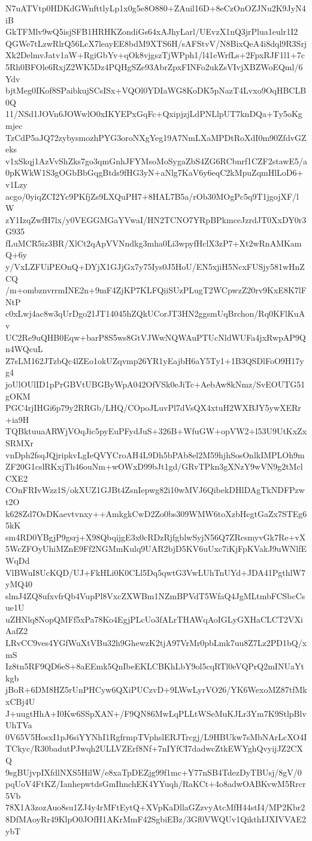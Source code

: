 N7uATVtp0HDKdGWnfttlyLp1x0g5e8O880+ZAuil16D+8eCzOnOZJNu2K9JyN4iB
GkTFMlv9wQ5isjSFB1HRHKZondiGs64xAJhyLarl/UEvzX1nQ3jrPlua1eulr1I2
QGWe7tLzwRlrQ56LcX7leayEE8bdM9XTS6H/sAFStvV/N8BixQeA4i8dql9R3Srj
Xk2DelmvJatv1aW+RgiGbYv+qOk8vjgszTjWPph1/l41eWrfLs+2FpxRJF1l1+7c
5Rh0BFOle6RxjZ2WK5Dz4PQHgSZe93AbrZpxFINFo2ukZsVIvjXBZWoEQml/6Ydv
bjtMeg0IKof8SPaibkujSCsISx+VQOl0YDIaWG8KoDK5pNazT4Lvxo9OqHBCLB0Q
11/NSd1JOVn6JOWwlO0xIKYEPxGqFc+QxipjzjLdPNLlpUT7knDQa+Ty5oKgmjec
TzCdP5aJQ72zybysmozhPYG3oroNXgYeg19A7NmLXaMPDtRoXdI0m90ZfdvGZeks
v1xSkqj1AzVvShZks7go3qmGnhJFYMsoMoSygaZbS4ZG6RCbnrf1CZF2stawE5/a
0pKWkW1S3gOGbBbGqgBtds9fHG3yN+aNlg7KaV6y6eqC2kMpuZqmHlLoD6+v1Lzy
acgo/0yiqZCI2Yc9PKfjZs9LXQuPH7+8HAL7B5a/rOb30MOgPc5q9T1jgojXF/lW
zY1IzqZwfH7lx/y0VEGGMGaYVwaI/HN2TCNO7YRpBPkmceJzrdJT0XxDY0r3G935
fLuMCR5iz3BR/XlCt2qApVVNndkg3mha0Li3wpyfHclX3zP7+Xt2wRnAMKamQ+6y
y/VxLZFUiPEOnQ+DYjX1GJjGx7y75Iys0J5HoU/EN5xjiH5NcxFUSjy581wHnZCQ
/m+ombznvrrmINE2n+9mF4ZjKP7KLFQiiSUzPLugT2WCpwzZ20rv9KxE8K7lFNtP
c0xLwj4ac8w3qUrDgo21JT14045hZQkUCorJT3HN2ggsmUqBrchon/Rq0KFlKuAv
UC2Re9uQHB0Eqw+barP8S5ws8GtVJWwNQWAuPTUcNldWUFa4jxRwpAP9Qn4WQcuL
Z7sLM162JTzbQc4lZEo1okUZqvmp26YR1yEajbH6aY5Ty1+1B3QSDlFoO9H17yg4
joUlOUlID1pPrGBVtUBGByWpA042OfVSk0eJiTc+AebAw8kNmz/SvEOUTG51gOKM
PGC4rjIHGi6p79y2RRGb/LHQ/COpoJLuvPl7dVsQX4xtuH2WXBJY5ywXERr+ia9H
TQBktuuaARWjVOqJic5pyEuPFydJuS+326B+WfuGW+opVW2+l53U9UtKxZxSRMXr
vnDph2fsqJQjripkvLgIeQVYCroAH4L9Dh5bPAb8el2M59hjhSosOnlkIMPLOh9m
ZF20G1cslRKxjTh46ouNm+wOWxD99bJt1gd/GRvTPkn3gXNzY9wVN9g2tMclCXE2
COnFRIvWzz1S/okXUZ1GJBt4ZsnIepwg82i10wMVJ6QibekDHlDAgTkNDFPzwt2O
k628Zd7OsDKaevtvnxy++AmkgkCwD2Zo0bs309WMW6toXzbHcgtGaZx7STEg65kK
sm4RD0YBgjP9gsrj+X98QbqijgE3x0cRDzRjfgblwSyjN56Q7ZRcsmyvGk7Re+vX
5WcZFOyUhiMZnE9Ff2NGMmKulq9UAR2bjD5KV6uUxc7iKjFpKVakJ9uWNlfEWqDd
VlBWuI8UcKQD/UJ+FkHLi0K0CLl5Dq5qwtG3VwLUhTnUYd+JDA41PgthlW7yMQ40
slmJ4ZQ8ufxvfrQb4VupPl8VxcZXWBm1NZmBPVdT5WfaQ4JgMLtmbFCSbcCsue1U
uZHNlq8NopQMFf5xPa78Ko4EgjPLcUo3fALrTHAWqAoIGLyGXHaCLCT2VXiAafZ2
LRvCC9ves4YGfWuXtVBu32h9GhewzK2tjA97VrMr0pbLmk7uu8Z7Lz2PD1bQ/xmS
Iz8tn5RF9QD6eS+8aEEmk5QnIbeEKLCBKhLbY9ol5cqRTl0eVQPrQ2mINUaYtkgb
jBoR+6DM8HZ5rUnPHCyw6QXiPUCzvD+9LWwLyrVO26/YK6WexoMZ87tfMkxCBj4U
J+uugtHhA+I0Kw6SSpXAN+/F9QN86MwLqPLLtWSeMuKJLr3Ym7K9StlpBlvUhTVa
0V65V5HosxI1pJ6siYYNhI1RgfrmpTVphslERJTrcgj/L9HBUkw7sMbNArLcXO4I
TCkyc/R30badutPJwqh2ULLVZErf8Nf+7nIYfCI7dadwcZtkEWYghQvyijJZ2CXQ
9sgBUjvpIXfdlNXS5HilW/e8xaTpDEZjg99f1mc+Y77nSB4TdezDyTBUsj/8gV/0
pqUoV4FtKZ/IanhepwtdsGmIhnchEK4YYuqh/RaKCt+4o8adwOABKvwM5Rrcr5Vb
78X1A3zozAuo8su1ZJ4y4rMFtEytQ+XVpKaDllaGZzvyAtcMfH44stI4/MP2Kbr2
8DfMAoyRr49KlpO0JOfH1AKrMmF42SgbiEBz/3Gf0VWQUv1QikthIJXIVVAE2ybT
